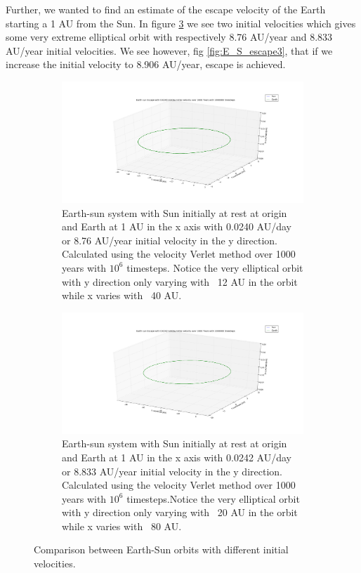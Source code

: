 \documentclass[a4paper,11pt]{article}
\begin{document}
{Further, we wanted to find an estimate of the escape velocity of the Earth starting a 1 AU from the Sun. In figure \ref{fig:E_S_escape} we see two initial velocities which gives some very extreme elliptical orbit with respectively 8.76 AU/year and 8.833 AU/year initial velocities. We see however, fig \ref{fig:E_S_escape3}, that if we increase the initial velocity to 8.906 AU/year, escape is achieved.


\begin{figure}[H]
	\centering
	\begin{subfigure}[b]{1\textwidth}
		\includegraphics[scale=0.3]{figure_6}
		\caption{Earth-sun system with Sun initially at rest at origin and Earth at 1 AU in the x axis with 0.0240 AU/day or 8.76 AU/year initial velocity in the y direction. Calculated using the velocity Verlet method over 1000 years with $10^{6}$ timesteps. Notice the very elliptical orbit with y direction only varying with ~12 AU in the orbit while x varies with ~40 AU.}
		\label{fig:E_S_escape1}
	\end{subfigure}
	\begin{subfigure}[b]{1\textwidth}
		\includegraphics[scale=0.3]{figure_7}
		\caption{Earth-sun system with Sun initially at rest at origin and Earth at 1 AU in the x axis with 0.0242 AU/day or 8.833 AU/year initial velocity in the y direction. Calculated using the velocity Verlet method over 1000 years with $10^{6}$ timesteps.Notice the very elliptical orbit with y direction only varying with ~20 AU in the orbit while x varies with ~80 AU.}
		\label{fig:E_S_escape2}
	\end{subfigure}
	\caption{Comparison between Earth-Sun orbits with different initial velocities.}
	\label{fig:E_S_escape}
\end{figure}

}
\end{document}
